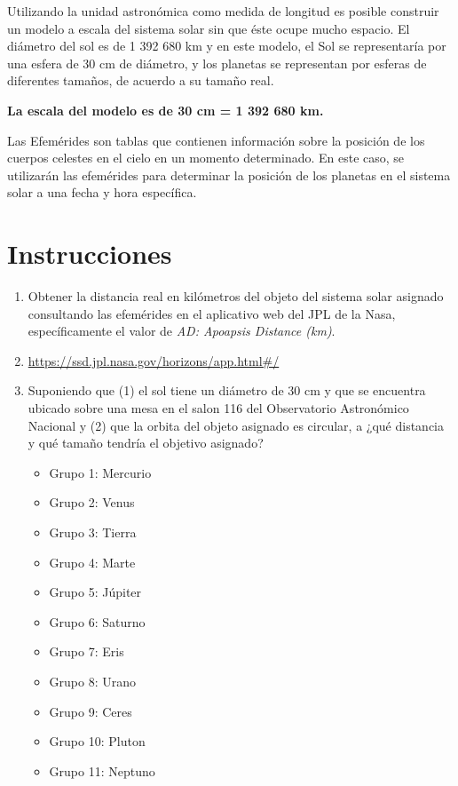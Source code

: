 \documentclass[12pt]{article}
\begin{document}
Utilizando la unidad astronómica como medida de longitud es posible construir un modelo a escala del sistema solar sin que éste ocupe mucho espacio. El diámetro del sol es de 1 392 680 km y en este modelo, el Sol se representaría por una esfera de 30 cm de diámetro, y los planetas se representan por esferas de diferentes tamaños, de acuerdo a su tamaño real.

\textbf{La escala del modelo es de 30 cm = 1 392 680 km.}

Las Efemérides son tablas que contienen información sobre la posición de los cuerpos celestes en el cielo en un momento determinado. En este caso, se utilizarán las efemérides para determinar la posición de los planetas en el sistema solar a una fecha y hora específica.

\section*{Instrucciones}
\begin{enumerate}
    \item Obtener la distancia real en kilómetros del objeto del sistema solar asignado consultando las efemérides en el aplicativo web del JPL de la Nasa, específicamente el valor de \textit{AD: Apoapsis Distance (km)}.
    \item \url{https://ssd.jpl.nasa.gov/horizons/app.html#/}

    \item Suponiendo que (1) el sol tiene un diámetro de 30 cm y que se encuentra ubicado sobre una mesa en el salon 116 del Observatorio Astronómico Nacional y (2) que la orbita del objeto asignado es circular, a ¿qué distancia y qué tamaño tendría el objetivo asignado?
    \begin{itemize}
        \item Grupo 1: Mercurio
        \item Grupo 2: Venus
        \item Grupo 3: Tierra
        \item Grupo 4: Marte
        \item Grupo 5: Júpiter
        \item Grupo 6: Saturno
        \item Grupo 7: Eris
        \item Grupo 8: Urano
        \item Grupo 9: Ceres
        \item Grupo 10: Pluton
        \item Grupo 11: Neptuno
    \end{itemize}
\end{enumerate}
\end{document}
